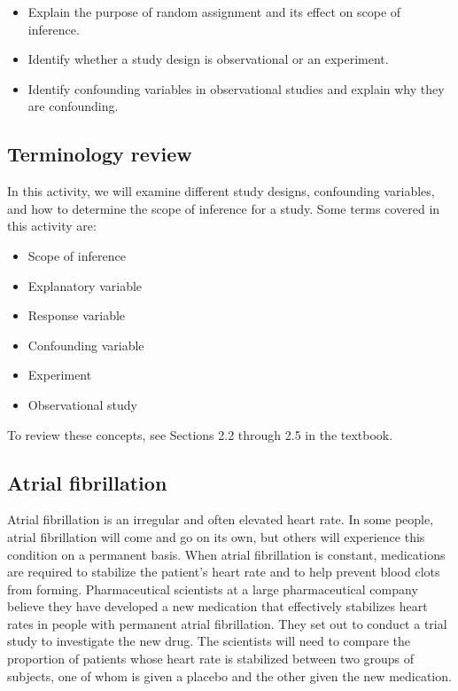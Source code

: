 \documentclass[
]{report}
\begin{document}
\begin{itemize}
\item
  Explain the purpose of random assignment and its effect on scope of inference.
\item
  Identify whether a study design is observational or an experiment.
\item
  Identify confounding variables in observational studies and explain why they are confounding.
\end{itemize}

\subsection{Terminology review}\label{terminology-review}

In this activity, we will examine different study designs, confounding variables, and how to determine the scope of inference for a study. Some terms covered in this activity are:

\begin{itemize}
\item
  Scope of inference
\item
  Explanatory variable
\item
  Response variable
\item
  Confounding variable
\item
  Experiment
\item
  Observational study
\end{itemize}

To review these concepts, see Sections 2.2 through 2.5 in the textbook.

\subsection{Atrial fibrillation}\label{atrial-fibrillation}

Atrial fibrillation is an irregular and often elevated heart rate. In some people, atrial fibrillation will come and go on its own, but others will experience this condition on a permanent basis. When atrial fibrillation is constant, medications are required to stabilize the patient's heart rate and to help prevent blood clots from forming. Pharmaceutical scientists at a large pharmaceutical company believe they have developed a new medication that effectively stabilizes heart rates in people with permanent atrial fibrillation. They set out to conduct a trial study to investigate the new drug. The scientists will need to compare the proportion of patients whose heart rate is stabilized between two groups of subjects, one of whom is given a placebo and the other given the new medication.
\end{document}
